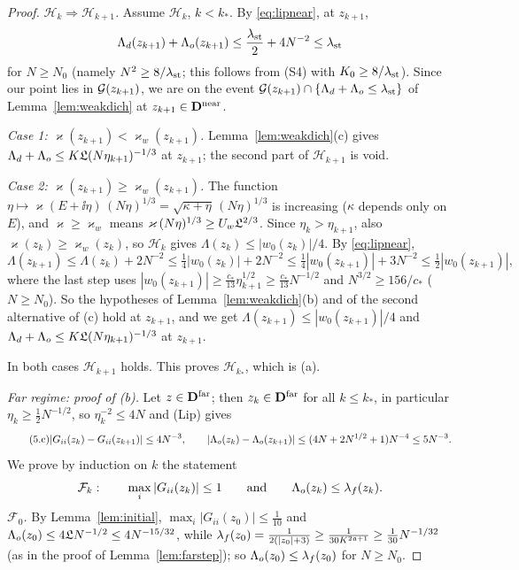 \begin{proof}
\emph{$\mathcal H_k\Rightarrow\mathcal H_{k+1}$.} Assume $\mathcal H_k$, $k<k_*$. By \eqref{eq:lipnear}, at $z_{k+1}$,
\[
 \Lambda_d(z_{k+1})+\Lambda_o(z_{k+1})\le\frac{\lambda_{\rm st}}2+4N^{-2}\le\lambda_{\rm st}
\]
for $N\ge N_0$ (namely $N^2\ge8/\lambda_{\rm st}$; this follows from (S4) with $K_0\ge8/\lambda_{\rm st}$). Since our point lies in $\mathcal{G}(z_{k+1})$, we are on the event $\mathcal{G}(z_{k+1})\cap\{\Lambda_d+\Lambda_o\le\lambda_{\rm st}\}$ of Lemma~\ref{lem:weakdich} at $z_{k+1}\in\mathbf{D}^{\rm near}$.

\emph{Case 1: $\varkappa(z_{k+1})<\varkappa_w(z_{k+1})$.} Lemma~\ref{lem:weakdich}(c) gives $\Lambda_d+\Lambda_o\le K\mathfrak{L}(N\eta_{k+1})^{-1/3}$ at $z_{k+1}$; the second part of $\mathcal H_{k+1}$ is void.

\emph{Case 2: $\varkappa(z_{k+1})\ge\varkappa_w(z_{k+1})$.} The function $\eta\mapsto\varkappa(E+\ii\eta)\,(N\eta)^{1/3}=\sqrt{\kappa+\eta}\,(N\eta)^{1/3}$ is increasing ($\kappa$ depends only on $E$), and $\varkappa\ge\varkappa_w$ means $\varkappa\,(N\eta)^{1/3}\ge U_w\mathfrak{L}^{2/3}$. Since $\eta_k>\eta_{k+1}$,
also $\varkappa(z_k)\ge\varkappa_w(z_k)$, so $\mathcal H_k$ gives $\Lambda(z_k)\le|w_0(z_k)|/4$. By \eqref{eq:lipnear},
\[
 \Lambda(z_{k+1})\le\Lambda(z_k)+2N^{-2}\le\tfrac14|w_0(z_k)|+2N^{-2}\le\tfrac14|w_0(z_{k+1})|+3N^{-2}\le\tfrac12|w_0(z_{k+1})|,
\]
where the last step uses $|w_0(z_{k+1})|\ge\frac{c_*}{13}\eta_{k+1}^{1/2}\ge\frac{c_*}{13}N^{-1/2}$ and $N^{3/2}\ge156/c_*$ ($N\ge N_0$). So the hypotheses of Lemma~\ref{lem:weakdich}(b) and of the second alternative of (c) hold at $z_{k+1}$, and we get
$\Lambda(z_{k+1})\le|w_0(z_{k+1})|/4$ and $\Lambda_d+\Lambda_o\le K\mathfrak{L}(N\eta_{k+1})^{-1/3}$ at $z_{k+1}$.

In both cases $\mathcal H_{k+1}$ holds. This proves $\mathcal H_{k_*}$, which is (a).

\medskip\emph{Far regime: proof of \textup{(b)}.} Let $z\in\mathbf{D}^{\rm far}$; then $z_k\in\mathbf{D}^{\rm far}$ for all $k\le k_*$, in particular $\eta_k\ge\frac12N^{-1/2}$, so $\eta_k^{-2}\le4N$ and (Lip) gives
\begin{equation}\tag{5.c}\label{eq:lipfar}
 |G_{ii}(z_k)-G_{ii}(z_{k+1})|\le4N^{-3},\qquad|\Lambda_o(z_k)-\Lambda_o(z_{k+1})|\le(4N+2N^{1/2}+1)N^{-4}\le5N^{-3}.
\end{equation}
We prove by induction on $k$ the statement
\[
 \mathcal F_k:\qquad\max_i|G_{ii}(z_k)|\le1\qquad\text{and}\qquad\Lambda_o(z_k)\le\lambda_f(z_k).
\]
\emph{$\mathcal F_0$.} By Lemma~\ref{lem:initial}, $\max_i|G_{ii}(z_0)|\le\frac1{10}$ and $\Lambda_o(z_0)\le4\mathfrak{L} N^{-1/2}\le4N^{-15/32}$, while $\lambda_f(z_0)=\frac1{2(|z_0|+3)}\ge\frac1{30K^{2\mathfrak{a}+1}}\ge\frac1{30}N^{-1/32}$ (as in the proof of Lemma~\ref{lem:farstep}); so $\Lambda_o(z_0)\le\lambda_f(z_0)$ for $N\ge N_0$.


\end{proof}
